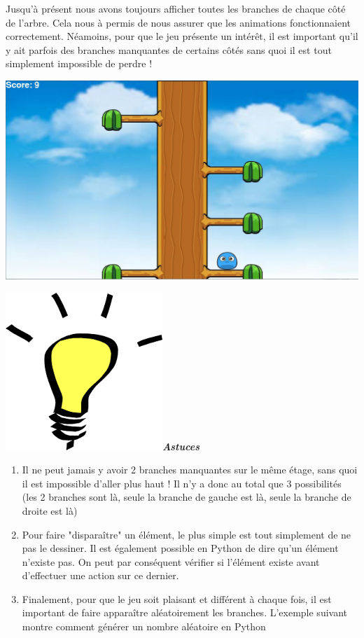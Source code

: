 \documentclass[french]{article}
\newcommand{\tips}{\includegraphics[scale=0.08]{tips}\textbf{\textit{Astuces\\}}}
\begin{document}
Jusqu'à présent nous avons toujours afficher toutes les branches de chaque côté de l'arbre. Cela nous à permis de nous assurer que les animations fonctionnaient correctement. Néamoins, pour que le jeu présente un intérêt, il est important qu'il y ait parfois des branches manquantes de certains côtés sans quoi il est tout simplement impossible de perdre !

\begin{center}
	\includegraphics[scale=0.20]{Image_4}
\end{center}

\tips

\begin{enumerate}

\item Il ne peut jamais y avoir 2 branches manquantes sur le même étage, sans quoi il est impossible d'aller plus haut ! Il n'y a donc au total que 3 possibilités (les 2 branches sont là, seule la branche de gauche est là, seule la branche de droite est là)\\

\item Pour faire "disparaître" un élément, le plus simple est tout simplement de ne pas le dessiner. Il est également possible en Python de dire qu'un élément n'existe pas. On peut par conséquent vérifier si l'élément existe avant d'effectuer une action sur ce dernier.

\begin{center}
	
\end{center}
 
\item Finalement, pour que le jeu soit plaisant et différent à chaque fois, il est important de faire apparaître aléatoirement les branches. L'exemple suivant montre comment générer un nombre aléatoire en Python 

\begin{center}
	
\end{center}

\end{enumerate}
\end{document}
